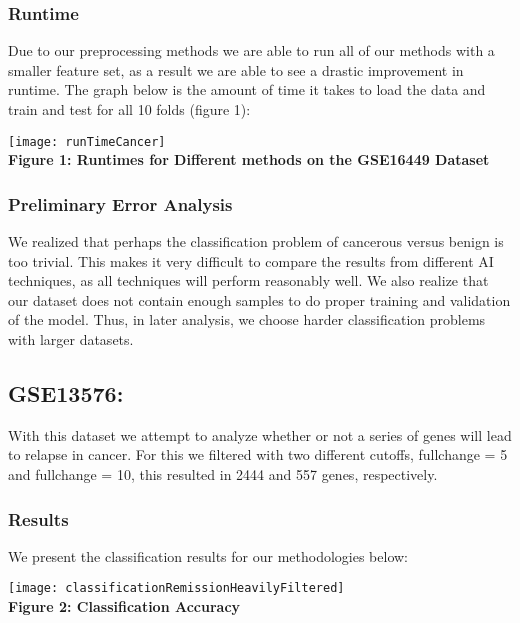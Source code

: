 \documentclass[12pt]{scrartcl}
\begin{document}
    
    
    
    \subsubsection{Runtime}
    Due to our preprocessing methods we are able to run all of our methods with a smaller feature set, as a result we are able to see a drastic improvement in runtime. The graph below is the amount of time it takes to load the data and train and test for all 10 folds (figure 1):
    
    \begin{center}
    \texttt{[image: runTimeCancer]}\\
    \textbf{Figure 1: Runtimes for Different methods on the GSE16449 Dataset}
    \end{center}
    
    \subsubsection{Preliminary Error Analysis}
    We realized that perhaps the classification problem of cancerous versus benign is too trivial. This makes it very difficult to compare the results from different AI techniques, as all techniques will perform reasonably well. We also realize that our dataset does not contain enough samples to do proper training and validation of the model. Thus, in later analysis, we choose harder classification problems with larger datasets.
    
    \subsection{GSE13576: }
    With this dataset we attempt to analyze whether or not a series of genes will lead to relapse in cancer. For this we filtered with two different cutoffs, fullchange = 5 and fullchange = 10, this resulted in 2444 and 557 genes, respectively. 
    
    \subsubsection{Results}
    We present the classification results for our methodologies below:
    
    \begin{center}
    \texttt{[image: classificationRemissionHeavilyFiltered]}\\
    \textbf{Figure 2: Classification Accuracy}
    \end{center}
   
\end{document}
